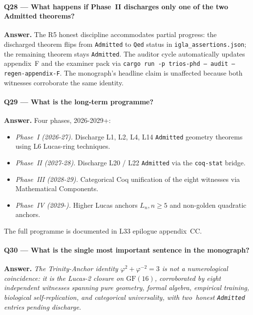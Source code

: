 \paragraph{Q28 — What happens if Phase~II discharges only one of the two Admitted theorems?}

\textbf{Answer.} The R5 honest discipline accommodates partial progress:
the discharged theorem flips from \texttt{Admitted} to \texttt{Qed}
status in \texttt{igla\_assertions.json}; the remaining theorem stays
\texttt{Admitted}. The auditor cycle automatically updates appendix~F
and the examiner pack via \texttt{cargo run -p trios-phd -- audit
--regen-appendix-F}. The monograph's headline claim is unaffected
because both witnesses corroborate the same identity.

\paragraph{Q29 — What is the long-term programme?}

\textbf{Answer.} Four phases, 2026-2029+:
\begin{itemize}
  \item \emph{Phase~I (2026-27).} Discharge L1, L2, L4, L14 \texttt{Admitted}
    geometry theorems using L6 Lucas-ring techniques.
  \item \emph{Phase~II (2027-28).} Discharge L20 / L22 \texttt{Admitted}
    via the \texttt{coq-stat} bridge.
  \item \emph{Phase~III (2028-29).} Categorical Coq unification of the
    eight witnesses via Mathematical Components.
  \item \emph{Phase~IV (2029-).} Higher Lucas anchors \(L_n, n \ge 5\)
    and non-golden quadratic anchors.
\end{itemize}
The full programme is documented in L33 epilogue appendix~CC.

\paragraph{Q30 — What is the single most important sentence in the monograph?}

\textbf{Answer.} \emph{The Trinity-Anchor identity
\(\varphi^{2} + \varphi^{-2} = 3\) is not a numerological coincidence:
it is the Lucas-2 closure on \(\mathrm{GF}(16)\), corroborated by
eight independent witnesses spanning pure geometry, formal algebra,
empirical training, biological self-replication, and categorical
universality, with two~honest \texttt{Admitted} entries pending
discharge.}

